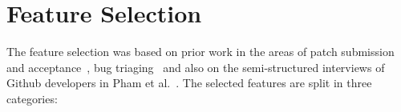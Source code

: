 \documentclass{sig-alternate}
\begin{document}
%

\section{Feature Selection}
\label{sec:featureselection}

The feature selection was based on prior work in the areas of patch submission
and acceptance~\cite{Nagap05,Bird07a,Weiss08,Jeong09,Baysa12}, bug
triaging~\cite{Anvik06, Giger10} and also on the semi-structured interviews of
Github developers in Pham et al.~\cite{Pham13}. The selected features are split
in three categories:
\end{document}
